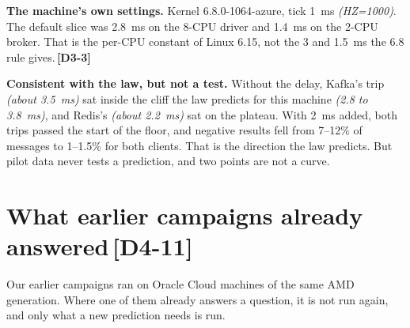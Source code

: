 \documentclass[11pt]{article}
\newcommand{\gl}[1]{{\color{soft}\itshape\small (#1)}}
\newcommand{\chgold}[1]{\,{\color{oldcol}\bfseries\footnotesize[#1]}}
\begin{document}
\textbf{The machine's own settings.} Kernel 6.8.0-1064-azure, tick 1~ms \gl{HZ=1000}. The default slice was 2.8~ms on the 8-CPU driver and 1.4~ms on the 2-CPU broker. That is the per-CPU constant of Linux 6.15, not the 3 and 1.5~ms the 6.8 rule gives.\chgold{D3-3}

\textbf{Consistent with the law, but not a test.} Without the delay, Kafka's trip \gl{about 3.5~ms} sat inside the cliff the law predicts for this machine \gl{2.8 to 3.8~ms}, and Redis's \gl{about 2.2~ms} sat on the plateau. With 2~ms added, both trips passed the start of the floor, and negative results fell from 7--12\% of messages to 1--1.5\% for both clients. That is the direction the law predicts. But pilot data never tests a prediction, and two points are not a curve.

\section[What earlier campaigns already answered]{What earlier campaigns already answered\protect\chgold{D4-11}}\label{sec:earlier}
Our earlier campaigns ran on Oracle Cloud machines of the same AMD generation. Where one of them already answers a question, it is not run again, and only what a new prediction needs is run.
\end{document}
